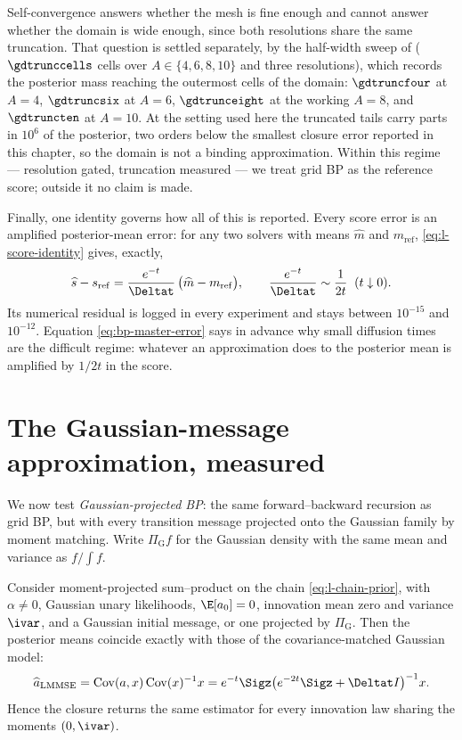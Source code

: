 Self-convergence answers whether the mesh is fine enough and cannot answer
whether the domain is wide enough, since both resolutions share the same
truncation. That question is settled separately, by the half-width sweep of
 ($\gdtrunccells$ cells over $A \in \{4,6,8,10\}$ and three
resolutions), which records the posterior mass reaching the outermost cells of
the domain: $\gdtruncfour$ at $A = 4$, $\gdtruncsix$ at $A = 6$,
$\gdtrunceight$ at the working $A = 8$, and $\gdtruncten$ at $A = 10$. At the
setting used here the truncated tails carry parts in $10^{6}$ of the
posterior, two orders below the smallest closure error reported in this
chapter, so the domain is not a binding approximation. Within this
regime --- resolution gated, truncation measured --- we treat grid BP as the
reference score; outside it no claim is made.

Finally, one identity governs how all of this is reported. Every score error is
an amplified posterior-mean error: for any two solvers with means $\widehat m$
and $m_{\mathrm{ref}}$, \eqref{eq:l-score-identity} gives, exactly,
\begin{equation}
  \widehat s - s_{\mathrm{ref}}
  = \frac{e^{-t}}{\Deltat}\,\big( \widehat m - m_{\mathrm{ref}} \big),
  \qquad
  \frac{e^{-t}}{\Deltat} \sim \frac{1}{2t} \;\; (t \downarrow 0).
  \label{eq:bp-master-error}
\end{equation}
Its numerical residual is logged in every experiment and stays between
$10^{-15}$ and $10^{-12}$. Equation \eqref{eq:bp-master-error} says in advance
why small diffusion times are the difficult regime: whatever an approximation
does to the posterior mean is amplified by $1/2t$ in the score.

\section{The Gaussian-message approximation, measured}
\label{sec:l-closure}

We now test \emph{Gaussian-projected BP}: the same forward--backward
recursion as grid BP, but with every transition message projected onto the
Gaussian family by moment matching. Write $\Pi_{\mathrm G} f$ for the Gaussian
density with the same mean and variance as $f/\!\int f$.

\begin{theorem}
\label{thm:l-lmmse}
Consider moment-projected sum--product on the chain
\eqref{eq:l-chain-prior}, with $\alpha\neq0$, Gaussian unary likelihoods,
$\E[a_0]=0$, innovation mean zero and variance $\ivar$, and a Gaussian
initial message, or one projected by $\Pi_{\mathrm G}$. Then the posterior
means coincide exactly with those of the covariance-matched Gaussian model:
\begin{equation}
  \widehat a_{\mathrm{LMMSE}}
  =
  \operatorname{Cov}(a,x)\operatorname{Cov}(x)^{-1}x
  =
  e^{-t}\Sigz
  \bigl(e^{-2t}\Sigz+\Deltat I\bigr)^{-1}x .
  \label{eq:l-lmmse}
\end{equation}
Hence the closure returns the same estimator for every innovation law sharing
the moments $(0,\ivar)$.
\end{theorem}

